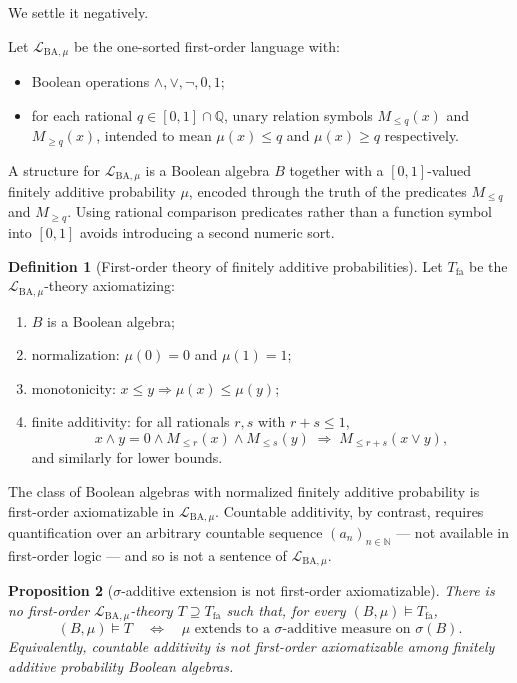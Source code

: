 \documentclass[preprint,12pt]{elsarticle}
\newtheorem{proposition}{Proposition}
\theoremstyle{definition}
\newtheorem{definition}[proposition]{Definition}
\newcommand{\Lmu}{\mathcal{L}_{\mathrm{BA},\mu}}
\newcommand{\Tfa}{T_{\mathrm{fa}}}
\newcommand{\Q}{\mathbb{Q}}
\newcommand{\N}{\mathbb{N}}
\begin{document}
We settle it negatively.

\medskip

Let $\Lmu$ be the one-sorted first-order language with:
\begin{itemize}
  \item Boolean operations $\wedge, \vee, \neg, 0, 1$;
  \item for each rational $q \in [0,1] \cap \Q$, unary relation symbols
        $M_{\leq q}(x)$ and $M_{\geq q}(x)$, intended to mean
        $\mu(x) \leq q$ and $\mu(x) \geq q$ respectively.
\end{itemize}

A structure for $\Lmu$ is a Boolean algebra $B$ together with a $[0,1]$-valued finitely
additive probability $\mu$, encoded through the truth of the predicates $M_{\leq q}$
and $M_{\geq q}$.  Using rational comparison predicates rather than a function symbol
into $[0,1]$ avoids introducing a second numeric sort.

\begin{definition}[First-order theory of finitely additive probabilities]
Let $\Tfa$ be the $\Lmu$-theory axiomatizing:
\begin{enumerate}[label=(\roman*)]
  \item $B$ is a Boolean algebra;
  \item normalization: $\mu(0) = 0$ and $\mu(1) = 1$;
  \item monotonicity: $x \leq y \Rightarrow \mu(x) \leq \mu(y)$;
  \item finite additivity: for all rationals $r, s$ with $r + s \leq 1$,
        \[
          x \wedge y = 0 \wedge M_{\leq r}(x) \wedge M_{\leq s}(y)
          \;\Rightarrow\; M_{\leq r+s}(x \vee y),
        \]
        and similarly for lower bounds.
\end{enumerate}
\end{definition}

\noindent
The class of Boolean algebras with normalized finitely additive probability is
first-order axiomatizable in $\Lmu$.  Countable additivity, by contrast, requires
quantification over an arbitrary countable sequence $(a_n)_{n \in \N}$ --- not
available in first-order logic --- and so is not a sentence of $\Lmu$.

\medskip

\begin{proposition}[$\sigma$-additive extension is not first-order axiomatizable]
\label{prop:not-fo}
There is no first-order $\Lmu$-theory $T \supseteq \Tfa$ such that, for every
$(B, \mu) \models \Tfa$,
\[
  (B, \mu) \models T \quad\Longleftrightarrow\quad
  \mu \text{ extends to a $\sigma$-additive measure on } \sigma(B).
\]
Equivalently, countable additivity is not first-order axiomatizable among
finitely additive probability Boolean algebras.
\end{proposition}
\end{document}

